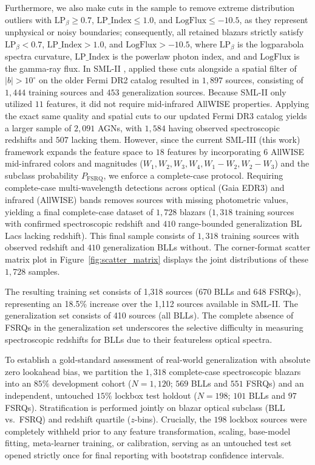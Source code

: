 \documentclass[twocolumn,linenumbers,floatfix]{aastex701}
\begin{document}
Furthermore, we also make cuts in the sample to remove extreme distribution outliers with $\text{LP}_\beta \ge 0.7$, $\text{LP\_Index} \le 1.0$, and $\text{LogFlux} \le -10.5$, as they represent unphysical or noisy boundaries; consequently, all retained blazars strictly satisfy $\text{LP}_\beta < 0.7$, $\text{LP\_Index} > 1.0$, and $\text{LogFlux} > -10.5$, where $\text{LP}_\beta$ is the logparabola spectra curvature, $\text{LP\_Index}$ is the powerlaw photon index, and and $\text{LogFlux}$ is the gamma-ray flux. In SML-II \citep{Narendra2022}, applied these cuts alongside a spatial filter of $|b| > 10^\circ$ on the older Fermi DR2 catalog resulted in $1,897$ sources, consisting of $1,444$ training sources and $453$ generalization sources. Because SML-II only utilized $11$ features, it did not require mid-infrared AllWISE properties. Applying the exact same quality and spatial cuts to our updated Fermi DR3 catalog yields a larger sample of $2,091$ AGNs, with $1,584$ having observed spectroscopic redshifts and $507$ lacking them. However, since the current SML-III (this work) framework expands the feature space to $18$ features by incorporating $6$ AllWISE mid-infrared colors and magnitudes ($W_1, W_2, W_3, W_4, W_1-W_2, W_2-W_3$) and the subclass probability $P_{\text{FSRQ}}$, we enforce a complete-case protocol. Requiring complete-case multi-wavelength detections across optical (Gaia EDR3) and infrared (AllWISE) bands removes sources with missing photometric values, yielding a final complete-case dataset of $1,728$ blazars ($1,318$ training sources with confirmed spectroscopic redshift and $410$ range-bounded generalization BL Lacs lacking redshift). This final sample consists of $1,318$ training sources with observed redshift and $410$ generalization BLLs without. The corner-format scatter matrix plot in Figure~\ref{fig:scatter_matrix} displays the joint distributions of these $1,728$ samples. 

The resulting training set consists of 1,318 sources (670 BLLs and 648 FSRQs), representing an 18.5\% increase over the 1,112 sources available in SML-II. The generalization set consists of 410 sources (all BLLs). The complete absence of FSRQs in the generalization set underscores the selective difficulty in measuring spectroscopic redshifts for BLLs due to their featureless optical spectra.

To establish a gold-standard assessment of real-world generalization with absolute zero lookahead bias, we partition the $1,318$ complete-case spectroscopic blazars into an $85\%$ development cohort ($N = 1,120$; $569$ BLLs and $551$ FSRQs) and an independent, untouched $15\%$ lockbox test holdout ($N = 198$; $101$ BLLs and $97$ FSRQs). Stratification is performed jointly on blazar optical subclass (BLL vs.\ FSRQ) and redshift quartile ($z$-bins). Crucially, the $198$ lockbox sources were completely withheld prior to any feature transformation, scaling, base-model fitting, meta-learner training, or calibration, serving as an untouched test set opened strictly once for final reporting with bootstrap confidence intervals.
\end{document}
